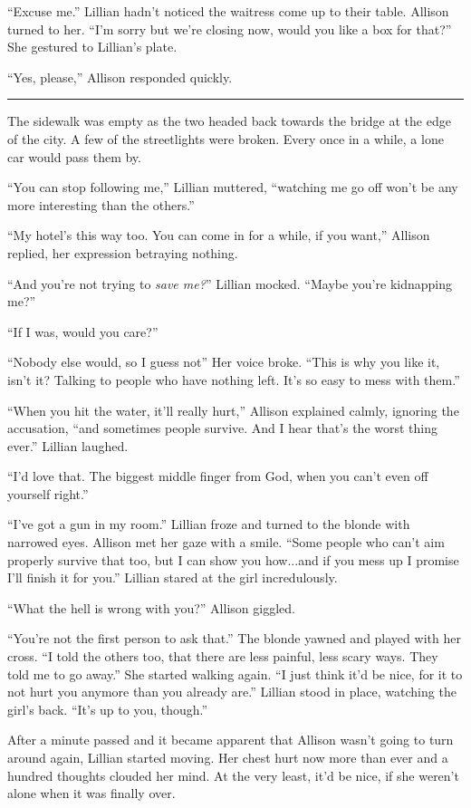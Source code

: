\begin{Standard}
``Excuse me.'' Lillian hadn't noticed the waitress come up to their table. Allison
turned to her. ``I'm sorry but we're closing now, would you like a box for that?''
She gestured to Lillian's plate.

``Yes, please,'' Allison responded quickly.

\fancybreak{* * *}

The sidewalk was empty as the two headed back towards the bridge at the edge of the city.
A few of the streetlights were broken. Every once in a while, a lone car would pass them
by.

``You can stop following me,'' Lillian muttered, ``watching me go off won't be any more
interesting than the others.''

``My hotel's this way too. You can come in for a while, if you want,'' Allison replied,
her expression betraying nothing.

``And you're not trying to \emph{save me?}'' Lillian mocked. ``Maybe you're kidnapping me?''

``If I was, would you care?''

``Nobody else would, so I guess not\textemdash{}'' Her voice broke. ``This is why you like
it, isn't it? Talking to people who have nothing left. It's so easy to mess with them.''

``When you hit the water, it'll really hurt,'' Allison explained calmly, ignoring the accusation,
``and sometimes people survive. And I hear that's the worst thing ever.'' Lillian laughed.

``I'd love that. The biggest middle finger from God, when you can't even off yourself right.''

``I've got a gun in my room.'' Lillian froze and turned to the blonde with narrowed eyes. Allison
met her gaze with a smile. ``Some people who can't aim properly survive that too, but I can show you
how...and if you mess up I promise I'll finish it for you.'' Lillian stared at the girl incredulously.

``What the hell is wrong with you?'' Allison giggled.

``You're not the first person to ask that.'' The blonde yawned and played with her cross.
``I told the others too, that there are less painful, less scary ways. They told me to
go away.'' She started walking again. ``I just think it'd be nice, for it to not hurt
you anymore than you already are.'' Lillian stood in place, watching the girl's back.
``It's up to you, though.''

After a minute passed and it became apparent that Allison wasn't going to turn around again,
Lillian started moving. Her chest hurt now more than ever and a hundred thoughts clouded
her mind. At the very least, it'd be nice, if she weren't alone when it was finally over.


\end{Standard}
